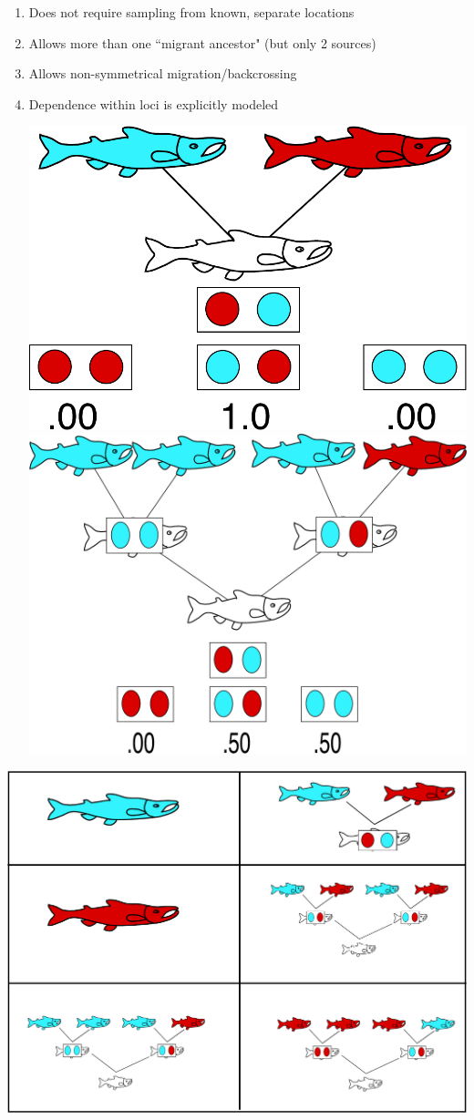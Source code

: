 \begin{enumerate}
\item Does not require sampling from known, separate locations
\item Allows more than
one ``migrant ancestor" (but only 2 sources)
\item Allows non-symmetrical migration/backcrossing
\item  Dependence within loci is explicitly modeled
\begin{center}
\includegraphics*[width=.4\textwidth]{illus/parents.pdf} \hfill
\includegraphics*[width=.4\textwidth]{illus/steel_backcross.pdf}
\end{center}
\end{enumerate}


%


\mbox{}\hspace*{-.32in}\includegraphics*[width=.98\textwidth]
{illus/explicit_model.pdf}





